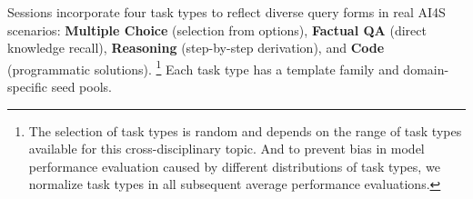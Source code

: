Sessions incorporate four task types to reflect diverse query forms in real AI4S scenarios: \textbf{Multiple Choice} (selection from options), \textbf{Factual QA} (direct knowledge recall), \textbf{Reasoning} (step-by-step derivation), and \textbf{Code} (programmatic solutions).
\footnote{The selection of task types is random and depends on the range of task types available for this cross-disciplinary topic. And to prevent bias in model performance evaluation caused by different distributions of task types, we normalize task types in all subsequent average performance evaluations.}
Each task type has a template family and domain-specific seed pools.



